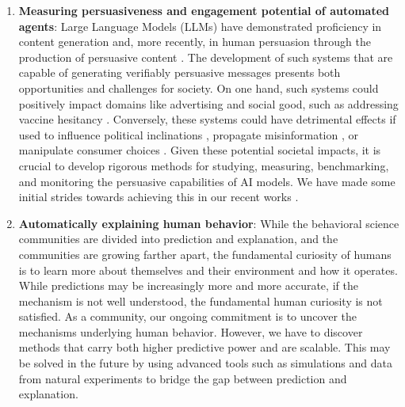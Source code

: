 \begin{enumerate}
    \item \textbf{Measuring persuasiveness and engagement potential of automated agents}: Large Language Models (LLMs) have demonstrated proficiency in content generation and, more recently, in human persuasion through the production of persuasive content \cite{durmus2024persuasion,singh2024measuring}. The development of such systems that are capable of generating verifiably persuasive messages presents both opportunities and challenges for society. On one hand, such systems could positively impact domains like advertising and social good, such as addressing vaccine hesitancy \cite{sekar2021domestic,PRWeek_DefeatDespairCOVID19}. Conversely, these systems could have detrimental effects if used to influence political inclinations \cite{tappin2023quantifying}, propagate misinformation \cite{lukito2020coordinating}, or manipulate consumer choices \cite{boerman2017online}. Given these potential societal impacts, it is crucial to develop rigorous methods for studying, measuring, benchmarking, and monitoring the persuasive capabilities of AI models. We have made some initial strides towards achieving this in our recent works \cite{singh2024measuring,khurana2023behavior}.


    \item \textbf{Automatically explaining human behavior}: While the behavioral science communities are divided into prediction and explanation, and the communities are growing farther apart, the fundamental curiosity of humans is to learn more about themselves and their environment and how it operates. While predictions may be increasingly more and more accurate, if the mechanism is not well understood, the fundamental human curiosity is not satisfied. As a community, our ongoing commitment is to uncover the mechanisms underlying human behavior. However, we have to discover methods that carry both higher predictive power and are scalable. This may be solved in the future by using advanced tools such as simulations and data from natural experiments to bridge the gap between prediction and explanation.


\end{enumerate}



